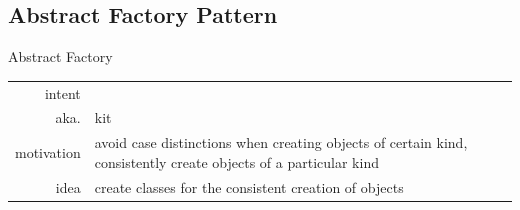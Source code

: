 %	

\subsection{Abstract Factory Pattern}
\begin{frame}{\insertsubsection}
	\begin{fancycolumns}
		\begin{definition}{Abstract Factory \mysource{\gof}}
			\setlength\tabcolsep{1mm}
			\begin{tabularx}{\textwidth}{rX}
				intent     & \mycite{Provide an interface for creating families of related or dependent objects without specifying their concrete classes.} \\
				aka.       & kit                                                                                                                            \\
				motivation & avoid case distinctions when creating objects of certain kind, consistently create objects of a particular kind                \\
				idea       & create classes for the consistent creation of objects
			\end{tabularx}
		\end{definition}
		\nextcolumn
	\end{fancycolumns}
\end{frame}


